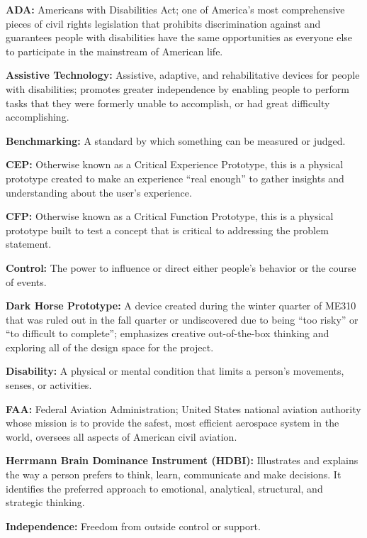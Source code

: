\documentclass[a4paper, 12pt,conference]{new_cit_thesis}
\begin{document}
\begin{list}{-}{}
  \item  \textbf{ADA:} Americans with Disabilities Act; one of America's most comprehensive pieces of civil rights legislation that prohibits discrimination against and guarantees people with disabilities have the same opportunities as everyone else to participate in the mainstream of American life.
  \item  \textbf{Assistive Technology:} Assistive, adaptive, and rehabilitative devices for people with disabilities; promotes greater independence by enabling people to perform tasks that they were formerly unable to accomplish, or had great difficulty accomplishing.
  \item  \textbf{Benchmarking:} A standard by which something can be measured or judged.
  \item  \textbf{CEP:} Otherwise known as a Critical Experience Prototype, this is a physical prototype created to make an experience “real enough” to gather insights and understanding about the user’s experience.
  \item  \textbf{CFP:} Otherwise known as a Critical Function Prototype, this is a physical prototype built to test a concept that is critical to addressing the problem statement.
  \item \textbf{Control:} The power to influence or direct either people's behavior or the course of events.
  \item \textbf{Dark Horse Prototype:} A device created during the winter quarter of ME310 that was ruled out in the fall quarter or undiscovered due to being “too risky” or “to difficult to complete”; emphasizes creative out-of-the-box thinking and exploring all of the design space for the project. 
  \item \textbf{Disability:} A physical or mental condition that limits a person's movements, senses, or activities.
  \item \textbf{FAA:} Federal Aviation Administration; United States national aviation authority whose mission is to provide the safest, most efficient aerospace system in the world, oversees all aspects of American civil aviation.
  \item \textbf{Herrmann Brain Dominance Instrument (HDBI):} Illustrates and explains the way a person prefers to think, learn, communicate and make decisions. It identifies the preferred approach to emotional, analytical, structural, and strategic thinking.
  \item \textbf{Independence:} Freedom from outside control or support.

\end{list}
\end{document}
